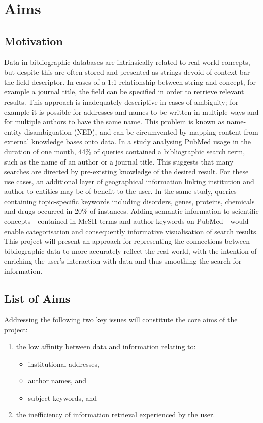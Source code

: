 \documentclass[PROP_AGutteridge_CS.tex]{subfiles}
\begin{document}
\chapter{Aims}
\section{Motivation}
Data in bibliographic databases are intrinsically related to real-world concepts, but despite this are often stored and presented as strings devoid of context bar the field descriptor. In cases of a 1:1 relationship between string and concept, for example a journal title, the field can be specified in order to retrieve relevant results. This approach is inadequately descriptive in cases of ambiguity; for example it is possible for addresses and names to be written in multiple ways and for multiple authors to have the same name. This problem is known as name-entity disambiguation (NED), and can be circumvented by mapping content from external knowledge bases onto data\cite{hoffart}. In a study analysing PubMed usage in the duration of one month, 44\% of queries contained a bibliographic search term, such as the name of an author or a journal title\cite{dogan}. This suggests that many searches are directed by pre-existing knowledge of the desired result. For these use cases, an additional layer of geographical information linking institution and author to entities may be of benefit to the user. In the same study, queries containing topic-specific keywords including disorders, genes, proteins, chemicals and drugs occurred in 20\% of instances. Adding semantic information to scientific concepts---contained in MeSH terms and author keywords on PubMed---would enable categorisation and consequently informative visualisation of search results. This project will present an approach for representing the connections between bibliographic data to more accurately reflect the real world, with the intention of enriching the user's interaction with data and thus smoothing the search for information. 

\section{List of Aims}
Addressing the following two key issues will constitute the core aims of the project:
\begin{enumerate}
\item the low affinity between data and information relating to:
	\begin{itemize}
	\item institutional addresses,
	\item author names, and 
	\item subject keywords, and
	\end{itemize}
\item the inefficiency of information retrieval experienced by the user.
\end{enumerate}
\end{document}
